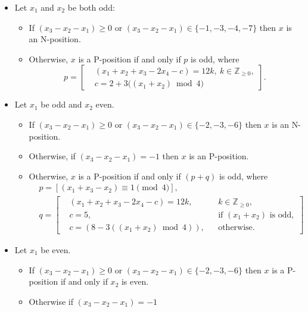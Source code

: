 \documentclass{article}
\theoremstyle{definition}
\begin{document}
\begin{itemize}
    \item Let $x_1$ and $x_2$ be both odd:
    \begin{itemize}
        \item If $(x_3 - x_2 - x_1) \geq 0$ or 
        $(x_3 - x_2 - x_1) \in \{-1, -3, -4, -7\}$ 
        then $x$ is an N-position.
        \item Otherwise, $x$ is a P-position if and only if $p$ is
          odd, where
\[
p =
\left[
  \begin{aligned}
  &(x_1 + x_2 + x_3 - 2x_4 - c) = 12k, \ k \in \mathbb{Z}_{\geq 0},
    \\
    &c =2+ 3\big((x_1 + x_2) \bmod 4\big)
  \end{aligned}
  \right].
\]
    \end{itemize}
    \item Let $x_1$ be odd and $x_2$  even.
    \begin{itemize}
        \item If $(x_3 - x_2 - x_1) \geq 0$ or $(x_3 - x_2 - x_1) \in \{-2, -3, -6\}$ 
        then $x$ is an N-position.
        \item Otherwise, if $(x_3 - x_2 - x_1) = -1$ then $x$ is an P-position.
        \item Otherwise, $x$ is a P-position if and only if $(p + q)$
          is odd, where
          \[
          \begin{aligned}            
&p = \left[    (x_1 + x_3 - x_2) \equiv 1 \pmod 4  \right],\\
            &q = \left[
              \begin{aligned}
                &(x_1 + x_2 + x_3 - 2x_4 - c) = 12k, && k \in
                \mathbb{Z}_{\geq 0},\\
                & c = 5, &&\text{if  $(x_1 + x_2)$ is odd},\\
                & c = (8 - 3((x_1 + x_2) \bmod 4)), &&\text{otherwise.}
  \end{aligned}
              \right]            
          \end{aligned}
\]
    \end{itemize}
    \item Let $x_1$ be even.
    \begin{itemize}
        \item If $(x_3 - x_2 - x_1) \geq 0$ or $(x_3 - x_2 - x_1) \in \{-2, -3, -6\}$ 
        then $x$ is a P-position if and only if $x_2$ is even.
        \item Otherwise if $(x_3 - x_2 - x_1) = -1 $

\end{itemize}
\end{itemize}
\end{document}
